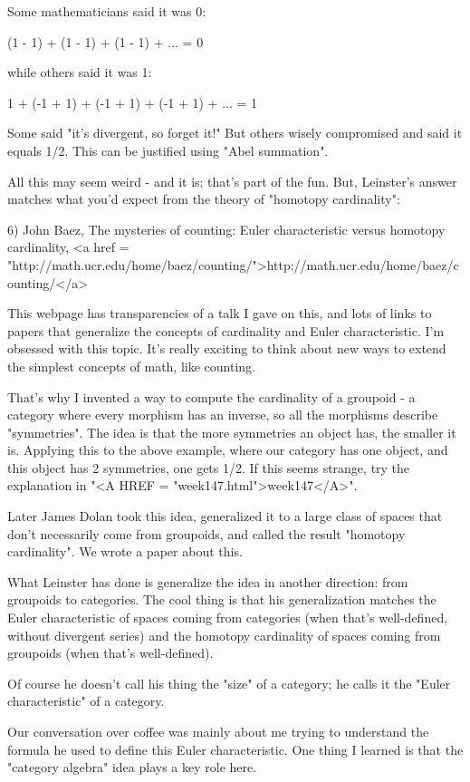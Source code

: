 Some mathematicians said it was 0:

(1 - 1) + (1 - 1) + (1 - 1) + ... = 0

while others said it was 1:

1 + (-1 + 1) + (-1 + 1) + (-1 + 1) + ... = 1

Some said "it's divergent, so forget it!" But others wisely
compromised and said it equals 1/2.  This can be justified using
"Abel summation".

All this may seem weird - and it is; that's part of the fun.  But,
Leinster's answer matches what you'd expect from the theory of
"homotopy cardinality":

6) John Baez, The mysteries of counting: Euler characteristic versus
homotopy cardinality, <a href = "http://math.ucr.edu/home/baez/counting/">http://math.ucr.edu/home/baez/counting/</a>

This webpage has transparencies of a talk I gave on this, and lots of 
links to papers that generalize the concepts of cardinality and Euler
characteristic.  I'm obsessed with this topic.  It's really exciting 
to think about new ways to extend the simplest concepts of math, like 
counting.  

That's why I invented a way to compute the cardinality of a groupoid -
a category where every morphism has an inverse, so all the morphisms
describe "symmetries".  The idea is that the more symmetries
an object has, the smaller it is.  Applying this to the above example,
where our category has one object, and this object has 2 symmetries,
one gets 1/2.  If this seems strange, try the explanation in "<A
HREF = "week147.html">week147</A>".

Later James Dolan took this idea, generalized it to a large class 
of spaces that don't necessarily come from groupoids, and called the
result "homotopy cardinality".  We wrote a paper about this.

What Leinster has done is generalize the idea in another direction: from 
groupoids to categories.  The cool thing is that his generalization 
matches the Euler characteristic of spaces coming from categories 
(when that's well-defined, without divergent series) and the homotopy 
cardinality of spaces coming from groupoids (when that's well-defined).

Of course he doesn't call his thing the "size" of a
category; he calls it the "Euler characteristic" of a
category.

Our conversation over coffee was mainly about me trying to understand
the formula he used to define this Euler characteristic.  One thing I
learned is that the "category algebra" idea plays a key role
here.

